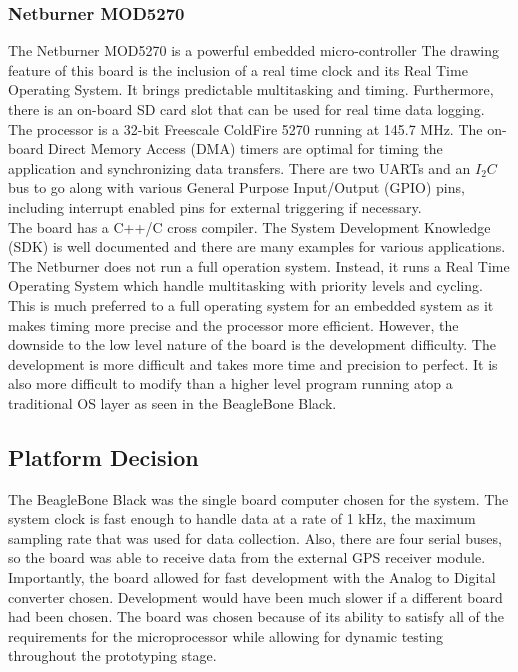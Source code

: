 \subsubsection{Netburner MOD5270}
\label{subsec:MOD5270}
\indent The Netburner MOD5270 is a powerful embedded
micro-controller The drawing feature of this board is the inclusion
of a real time clock and its Real Time Operating System. It brings
predictable multitasking and timing. Furthermore, there is an
on-board SD card slot that can be used for real time data
logging. The processor is a 32-bit Freescale ColdFire 5270
running at 145.7 MHz. The on-board Direct Memory Access (DMA)
timers are optimal for timing the application and
synchronizing data transfers. There are two UARTs and an
$I_2C$ bus to go along with various General Purpose
Input/Output (GPIO) pins, including interrupt enabled pins
for external triggering if necessary. \\

\indent The board has a C++/C cross compiler. The System Development
Knowledge (SDK) is well documented and there are many examples for
various applications. The Netburner does not run a full operation
system. Instead, it runs a Real Time Operating System which
handle multitasking with priority levels and cycling. This is
much preferred to a full operating system for an embedded system
as it makes timing more precise and the processor more
efficient. However, the downside to the low level nature of
the board is the development difficulty. The development is
more difficult and takes more time and precision to
perfect. It is also more difficult to modify than a higher
level program running atop a traditional OS layer as seen
in the BeagleBone Black.

\subsection{Platform Decision}

The BeagleBone Black was the single board computer chosen for the
system. The system clock is fast enough to handle data at a rate of
1 kHz, the maximum sampling rate that was used for data
collection. Also, there are four serial buses, so the board was
able to receive data from the external GPS receiver module.
Importantly, the board allowed for fast development with the
Analog to Digital converter chosen. Development would have
been much slower if a different board had been chosen. The
board was chosen because of its ability to satisfy all of the
requirements for the microprocessor while allowing for
dynamic testing throughout the prototyping stage. 
